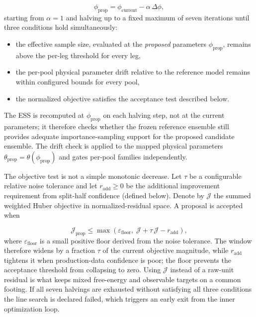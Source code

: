 \begin{equation}
    \phi_{\mathrm{prop}}
    =
    \phi_{\mathrm{current}}
    -
    \alpha \, \Delta \phi,
\end{equation}
%
starting from $\alpha=1$ and halving up to a fixed maximum of seven iterations until three conditions hold simultaneously:

\begin{itemize}
    \item the effective sample size, evaluated at the \emph{proposed} parameters $\phi_{\mathrm{prop}}$, remains above the per-leg threshold for every leg,
    \item the per-pool physical parameter drift relative to the reference model remains within configured bounds for every pool,
    \item the normalized objective satisfies the acceptance test described below.
\end{itemize}

The ESS is recomputed at $\phi_{\mathrm{prop}}$ on each halving step, not at the current parameters; it therefore checks whether the frozen reference ensemble still provides adequate importance-sampling support for the proposed candidate ensemble. The drift check is applied to the mapped physical parameters $\theta_{\mathrm{prop}} = \theta(\phi_{\mathrm{prop}})$ and gates per-pool families independently.

The objective test is not a simple monotonic decrease. Let $\tau$ be a configurable relative noise tolerance and let $r_{\mathrm{add}} \geq 0$ be the additional improvement requirement from split-half confidence (defined below). Denote by $\mathcal{J}$ the summed weighted Huber objective in normalized-residual space. A proposal is accepted when

\begin{equation}
    \mathcal{J}_{\mathrm{prop}}
    \leq
    \max\!\left(\varepsilon_{\mathrm{floor}},\;
        \mathcal{J}
        +
        \tau \, \mathcal{J}
        -
        r_{\mathrm{add}}
    \right),
    \label{eq:lsaccept}
\end{equation}
%
where $\varepsilon_{\mathrm{floor}}$ is a small positive floor derived from the noise tolerance. The window therefore widens by a fraction $\tau$ of the current objective magnitude, while $r_{\mathrm{add}}$ tightens it when production-data confidence is poor; the floor prevents the acceptance threshold from collapsing to zero. Using $\mathcal{J}$ instead of a raw-unit residual is what keeps mixed free-energy and observable targets on a common footing. If all seven halvings are exhausted without satisfying all three conditions the line search is declared failed, which triggers an early exit from the inner optimization loop.

